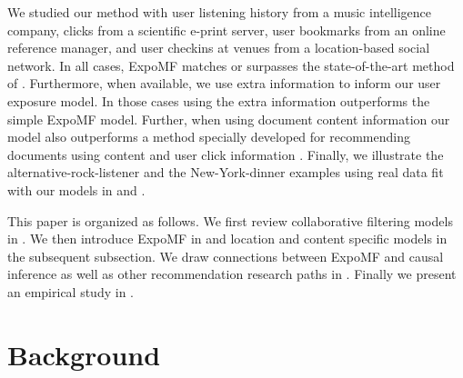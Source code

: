 We studied our method with user listening history from a music intelligence company, clicks from a scientific e-print server, user
bookmarks from an online reference manager, and user checkins at venues from a 
location-based social network. In all cases, ExpoMF matches or surpasses
the state-of-the-art method of \citet{hu2008collaborative}. Furthermore, when
available, we use extra information to inform our user exposure model. In those
cases using the extra information outperforms the simple ExpoMF model.
Further, when using document content information our model also
outperforms a method specially developed for recommending documents using content and user click information 
\cite{wang2011collaborative}. Finally, we illustrate the
alternative-rock-listener and the New-York-dinner examples using real data fit 
with our models in  and . 




This paper is organized as follows. We first review collaborative filtering models in . We
then introduce ExpoMF in  and location and content
specific models in the subsequent subsection. We draw connections between ExpoMF and causal inference as well as other recommendation research paths in
. Finally we present an empirical study in
.



\section{Background}
\label{sec:background}

